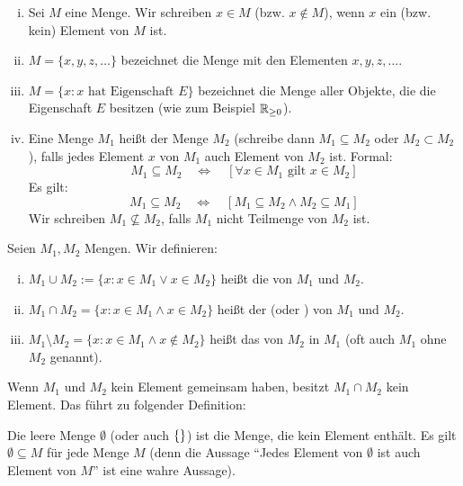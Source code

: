 \begin{definition}[Teilmenge]
	\label{def:I.2.3}
	\begin{enumerate}[(i)]
		\item Sei $M$ eine Menge.
		Wir schreiben $x \in M$ (bzw. $x \notin M$), wenn $x$ ein (bzw. kein) Element von $M$ ist.
		\item $M = \{x,y,z,\dots\}$ bezeichnet die Menge mit den Elementen $x,y,z,\dots$.
		\item $M = \{x : x \text{ hat Eigenschaft } E\}$ bezeichnet die Menge aller Objekte, die die Eigenschaft $E$ besitzen (wie zum Beispiel $\mathbb{R}_{\geq 0}$).
		\item Eine Menge $M_1$ heißt  der Menge $M_2$ (schreibe dann $M_1 \subseteq M_2$ oder $M_2 \subset M_2$), falls jedes Element $x$ von $M_1$ auch Element von $M_2$ ist.
		Formal:
		\[
			M_1 \subseteq M_2 \quad \Leftrightarrow \quad [\forall x \in M_1 \text{ gilt } x \in M_2]
		\]
		Es gilt:
		\[
			M_1 \subseteq M_2 \quad \Leftrightarrow \quad [M_1 \subseteq M_2 \wedge M_2 \subseteq M_1]
		\]
		Wir schreiben $M_1 \nsubseteq M_2$, falls $M_1$ nicht Teilmenge von $M_2$ ist.
	\end{enumerate}
\end{definition}

\begin{definition}
	\label{def:I.2.4}
	Seien $M_1, M_2$ Mengen.
	Wir definieren:
	\begin{enumerate}[(i)]
		\item $M_1 \cup M_2 := \{x : x \in M_1 \vee x \in M_2\}$ heißt die  von $M_1$ und $M_2$.
		\item $M_1 \cap M_2 = \{x : x \in M_1 \wedge x \in M_2\}$ heißt der  (oder ) von $M_1$ und $M_2$.
		\item $M_1 \setminus M_2 = \{x : x \in M_1 \wedge x \notin M_2\}$ heißt das  von $M_2$ in $M_1$ (oft auch  $M_1$ ohne $M_2$ genannt).
	\end{enumerate}
\end{definition}

Wenn $M_1$ und $M_2$ kein Element gemeinsam haben, besitzt $M_1 \cap M_2$ kein Element.
Das führt zu folgender Definition:

\begin{definition}
	\label{def:I.2.5}
	Die leere Menge $\emptyset$ (oder auch $\left\{\right\}$) ist die Menge, die kein Element enthält.
	Es gilt $\emptyset \subseteq M$ für jede Menge $M$ (denn die Aussage \enquote{Jedes Element von $\emptyset$ ist auch Element von $M$} ist eine wahre Aussage).
\end{definition}


